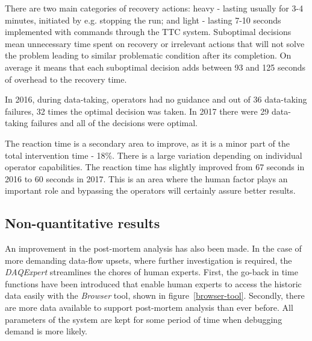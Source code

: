 \documentclass[a4paper]{jpconf}
\begin{document}
There are two main categories of recovery actions: heavy - lasting usually for 3-4 minutes, initiated by e.g. stopping the run; and light - lasting 7-10 seconds implemented with commands through the TTC system. Suboptimal decisions mean unnecessary time spent on recovery or irrelevant actions that will not solve the problem leading to similar problematic condition after its completion. On average it means that each suboptimal decision adds between 93 and 125 seconds of overhead to the recovery time.

In 2016, during data-taking, operators had no guidance and out of 36 data-taking failures, 32 times the optimal decision was taken. In 2017 there were 29 data-taking failures and all of the decisions were optimal.

The reaction time is a secondary area to improve, as it is a minor part of the total intervention time - 18\%. There is a large variation depending on individual operator capabilities. The reaction time has slightly improved from 67 seconds in 2016 to 60 seconds in 2017. This is an area where the human factor plays an important role and bypassing the operators will certainly assure better results.


\subsection{Non-quantitative results}
An improvement in the post-mortem analysis has also been made. In the case of more demanding data-flow upsets, where further investigation is required, the{ \it DAQExpert} streamlines the chores of human experts. First, the go-back in time functions have been introduced that enable human experts to access the historic data easily with the {\it Browser} tool, shown in figure~\ref {browser-tool}. Secondly, there are more data available to support post-mortem analysis than ever before. All parameters of the system are kept for some period of time when debugging demand is more likely.
\end{document}
